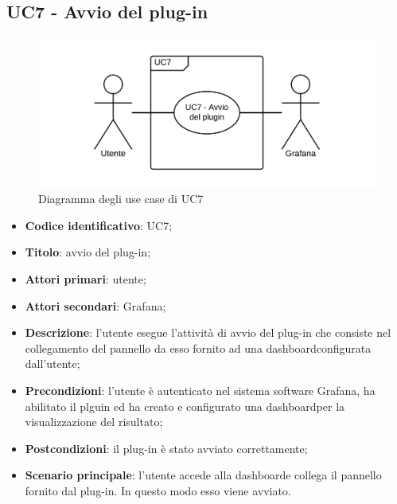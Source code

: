 \subsection{UC7 - Avvio del plug-in}
\begin{figure}[H]
	\includegraphics{img/UC7_-_Avvio_plugin.png}
	\caption{Diagramma degli use case di UC7}
\end{figure}
\begin{itemize}
	\item \textbf{Codice identificativo}: UC7;
	\item \textbf{Titolo}: avvio del plug-in;
	\item \textbf{Attori primari}: utente;
	\item \textbf{Attori secondari}: Grafana\glo;
	\item \textbf{Descrizione}: l'utente esegue l'attività di avvio del plug-in che consiste nel collegamento del pannello da esso fornito ad una dashboard\glosp configurata dall'utente;
	\item \textbf{Precondizioni}: l'utente è autenticato nel sistema software Grafana\glo, ha abilitato il plguin ed ha creato e configurato una dashboard\glosp per la visualizzazione del risultato;
	\item \textbf{Postcondizioni}: il plug-in è stato avviato correttamente;
	\item \textbf{Scenario principale}: l'utente accede alla dashboard\glosp e collega il pannello fornito dal plug-in. In questo modo esso viene avviato.
\end{itemize}

